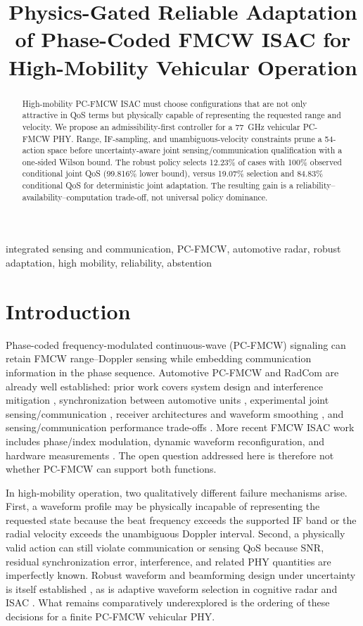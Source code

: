 \documentclass[conference,a4paper]{IEEEtran}
\title{Physics-Gated Reliable Adaptation of Phase-Coded FMCW ISAC for High-Mobility Vehicular Operation}
\author{\IEEEauthorblockN{Panagiota Grosdouli}
\IEEEauthorblockA{Affiliation to be inserted before submission\\
Email: panagros1@ee.duth.gr}}
\begin{document}
\maketitle

\begin{abstract}
High-mobility PC-FMCW ISAC must choose configurations that are not only attractive in QoS terms but physically capable of representing the requested range and velocity. We propose an admissibility-first controller for a \SI{77}{GHz} vehicular PC-FMCW PHY. Range, IF-sampling, and unambiguous-velocity constraints prune a 54-action space before uncertainty-aware joint sensing/communication qualification with a one-sided Wilson bound. The robust policy selects 12.23\% of cases with 100\% observed conditional joint QoS (99.816\% lower bound), versus 19.07\% selection and 84.83\% conditional QoS for deterministic joint adaptation. The resulting gain is a reliability--availability--computation trade-off, not universal policy dominance.
\end{abstract}

\begin{IEEEkeywords}
integrated sensing and communication, PC-FMCW, automotive radar, robust adaptation, high mobility, reliability, abstention
\end{IEEEkeywords}

\section{Introduction}

Phase-coded frequency-modulated continuous-wave (PC-FMCW) signaling can retain FMCW range--Doppler sensing while embedding communication information in the phase sequence. Automotive PC-FMCW and RadCom are already well established: prior work covers system design and interference mitigation \cite{uysal2020pcfmcw}, synchronization between automotive units \cite{lampel2020sync}, experimental joint sensing/communication \cite{kumbul2021experimental}, receiver architectures and waveform smoothing \cite{kumbul2022receiver,kumbul2022smoothed}, and sensing/communication performance trade-offs \cite{kumbul2023performance}. More recent FMCW ISAC work includes phase/index modulation, dynamic waveform reconfiguration, and hardware measurements \cite{temiz2026impm,temiz2026tcomm}. The open question addressed here is therefore not whether PC-FMCW can support both functions.

In high-mobility operation, two qualitatively different failure mechanisms arise. First, a waveform profile may be physically incapable of representing the requested state because the beat frequency exceeds the supported IF band or the radial velocity exceeds the unambiguous Doppler interval. Second, a physically valid action can still violate communication or sensing QoS because SNR, residual synchronization error, interference, and related PHY quantities are imperfectly known. Robust waveform and beamforming design under uncertainty is itself established \cite{wang2024robustwaveform,lyu2024dualrobust}, as is adaptive waveform selection in cognitive radar and ISAC \cite{tholeti2024online,yazar2026adaptive}. What remains comparatively underexplored is the ordering of these decisions for a finite PC-FMCW vehicular PHY.
\end{document}
